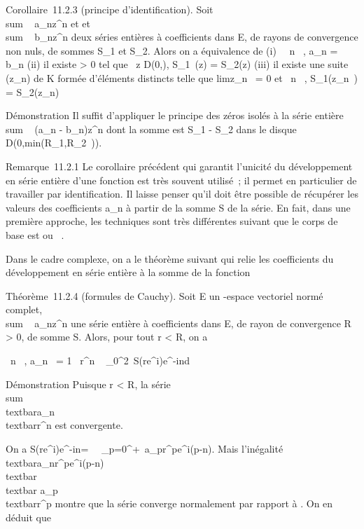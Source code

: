 \documentclass[]{article}
\begin{document}
Corollaire~11.2.3 (principe d'identification). Soit
\\sum ~
a\_nz^n et et
\\sum ~
b\_nz^n deux séries entières à coefficients dans E,
de rayons de convergence non nuls, de sommes S\_1 et
S\_2. Alors on a équivalence de (i) \forall~~n
\in {}~, a\_n = b\_n (ii) il existe \eta \textgreater{} 0 tel
que \forall~z \in D(0,\eta), S\_1~(z) =
S\_2(z) (iii) il existe une suite (z\_n) de K formée
d'éléments distincts telle que limz\_n~
= 0 et \forall~n \in {}~, S\_1(z\_n~) =
S\_2(z\_n)

Démonstration Il suffit d'appliquer le principe des zéros isolés à la
série entière \\sum ~
(a\_n - b\_n)z^n dont la somme est
S\_1 - S\_2 dans le disque
D(0,min(R\_1,R\_2~)).

Remarque~11.2.1 Le corollaire précédent qui garantit l'unicité du
développement en série entière d'une fonction est très souvent utilisé~;
il permet en particulier de travailler par identification. Il laisse
penser qu'il doit être possible de récupérer les valeurs des
coefficients a\_n à partir de la somme S de la série. En fait,
dans une première approche, les techniques sont très différentes suivant
que le corps de base est  ou ~.

Dans le cadre complexe, on a le théorème suivant qui relie les
coefficients du développement en série entière à la somme de la fonction

Théorème~11.2.4 (formules de Cauchy). Soit E un -espace vectoriel normé
complet, \\sum ~
a\_nz^n une série entière à coefficients dans E, de
rayon de convergence R \textgreater{} 0, de somme S. Alors, pour tout r
\textless{} R, on a

\forall~n \in {}~, a\_n~ = 1
\pi~r^n \int ~
\_0^2\pi~S(re^i\theta)e^-in\theta d\theta

Démonstration Puisque r \textless{} R, la série
\\sum ~
\\textbar{}a\_n\\textbar{}r^n
est convergente.

On a S(re^i\theta)e^-in\theta =\
\sum ~
\_p=0^+\infty~a\_pr^pe^i(p-n)\theta.
Mais l'inégalité
\\textbar{}a\_nr^pe^i(p-n)\theta\\textbar{}
\leq\\textbar{}
a\_p\\textbar{}r^p montre que la série
converge normalement par rapport à \theta. On en déduit que
\end{document}
